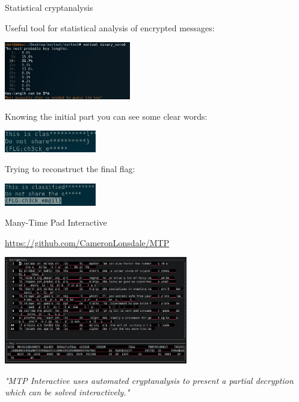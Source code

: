 \documentclass[handout, xcolor=dvipsnames,aspectratio=169]{beamer}
\begin{document}
\begin{frame}{Statistical cryptanalysis}

  \centering

  Useful tool for statistical analysis of encrypted messages:

  \includegraphics[width=5.5cm]{img/xortool}

  \pause

  Knowing the initial part you can see some clear words:

  \centering\includegraphics[width=4cm]{img/xor1}

  Trying to reconstruct the final flag:

  \centering\includegraphics[width=4cm]{img/xor2}

\end{frame}

\begin{frame}{Many-Time Pad Interactive}

  \url{https://github.com/CameronLonsdale/MTP}

  \smallskip

  \centering\includegraphics[width=8cm]{img/MTP}

  \smallskip

  \textit{"MTP Interactive uses automated cryptanalysis to present a partial decryption which can be solved interactively."}


\end{frame}
\end{document}
